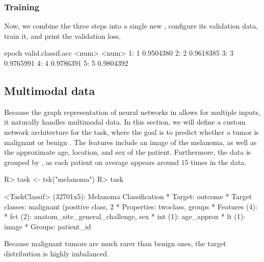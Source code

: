 \documentclass[article]{jss}
\theoremstyle{definition}
\begin{document}
\subsubsection{Training}

Now, we combine the three steps into a single new , configure its validation data, train it, and print the validation loss.

\begin{CodeOutput}
   epoch valid.classif.acc
   <num>             <num>
1:     1         0.9504380
2:     2         0.9618385
3:     3         0.9765991
4:     4         0.9786391
5:     5         0.9804392
\end{CodeOutput}

\subsection{Multimodal data}\label{sec:multimodal}

Because the graph representation of neural networks in  allows for multiple inputs, it naturally handles multimodal data.
In this section, we will define a custom network architecture for the  task, where the goal is to predict whether a tumor is malignant or benign \citep{ref-international2020siim}.
The features include an image of the melanoma, as well as the approximate age, location, and sex of the patient.
Furthermore, the data is grouped by , as each patient on average appears around $15$ times in the data.

\begin{CodeInput}
R> task <- tsk("melanoma")
R> task
\end{CodeInput}
\begin{CodeOutput}
<TaskClassif> (32701x5): Melanoma Classification
* Target: outcome
* Target classes: malignant (positive class, 2%
* Properties: twoclass, groups
* Features (4):
  * fct (2): anatom_site_general_challenge, sex
  * int (1): age_approx
  * lt (1): image
* Groups: patient_id
\end{CodeOutput}

Because malignant tumors are much rarer than benign ones, the target distribution is highly imbalanced.
\end{document}
